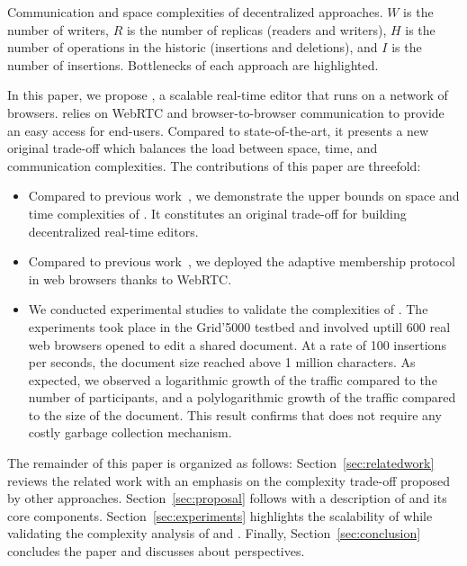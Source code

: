 \begin{table*}[t]
  \centering
  
  \caption{\label{table:complexities}
    Communication and space complexities of decentralized approaches.
    $W$ is the number of writers, 
    $R$ is the number of replicas (readers and writers),
    $H$ is the number of operations in the historic (insertions and deletions),
    and $I$ is the number of insertions.
    Bottlenecks of each approach are highlighted.}
\end{table*}

In this paper, we propose \CRATE, a scalable real-time editor that runs on a
network of browsers. \CRATE relies on WebRTC and browser-to-browser
communication to provide an easy access for end-users. Compared to
state-of-the-art, it presents a new original trade-off which balances the load
between space, time, and communication complexities. The contributions of this
paper are threefold:
\begin{itemize}
\item Compared to previous work~\cite{nedelec2013lseq}, we demonstrate the upper
  bounds on space and time complexities of \LSEQ. It constitutes an original
  trade-off for building decentralized real-time editors.
\item Compared to previous work~\cite{nedelec2015spray}, we deployed the
  adaptive membership protocol \SPRAY in web browsers thanks to
  WebRTC. 
\item We conducted experimental studies to validate the complexities of
  \CRATE. The experiments took place in the Grid'5000 testbed and involved
  uptill $600$ real web browsers opened to edit a shared document. At a rate of
  100 insertions per seconds, the document size reached above 1 million
  characters. As expected, we observed a logarithmic growth of the traffic
  compared to the number of participants, and a polylogarithmic growth of the
  traffic compared to the size of the document. This result confirms that \CRATE
  does not require any costly garbage collection mechanism.
\end{itemize}

The remainder of this paper is organized as follows:
Section~\ref{sec:relatedwork} reviews the related work with an emphasis on the
complexity trade-off proposed by other approaches. Section~\ref{sec:proposal}
follows with a description of \CRATE and its core
components. Section~\ref{sec:experiments} highlights the scalability of \CRATE
while validating the complexity analysis of \LSEQ and \SPRAY. Finally,
Section~\ref{sec:conclusion} concludes the paper and discusses about
perspectives.

